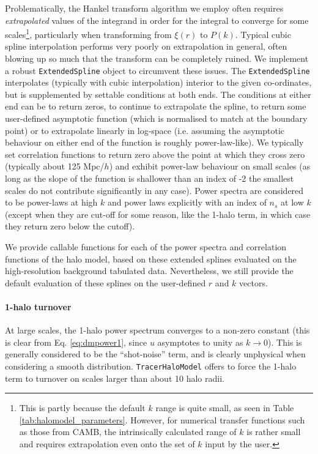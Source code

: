 \documentclass[5p,aas_macros]{elsarticle}
\begin{document}
Problematically, the Hankel transform algorithm we employ often requires \textit{extrapolated} values of the integrand in order for the integral to converge for some scales\footnote{This is partly because the default $k$ range is quite small, as seen in Table \ref{tab:halomodel_parameters}. However, for numerical transfer functions such as those from CAMB, the intrinsically calculated range of $k$ is rather small and requires extrapolation even onto the set of $k$ input by the user.}, particularly when transforming from $\xi(r)$ to $P(k)$.
Typical cubic spline interpolation performs very poorly on extrapolation in general, often blowing up so much that the transform can be completely ruined.
We implement a robust \verb|ExtendedSpline| object to circumvent these issues. 
The \verb|ExtendedSpline| interpolates (typically with cubic interpolation) interior to the given co-ordinates, but is supplemented by settable conditions at both ends. 
The conditions at either end can be to return zeros, to continue to extrapolate the spline, to return some user-defined asymptotic function (which is normalised to match at the boundary point) or to extrapolate linearly in log-space (i.e. assuming the asymptotic behaviour on either end of the function is roughly power-law-like). 
We typically set correlation functions to return zero above the point at which they cross zero (typically about 125 Mpc/$h$) and exhibit power-law behaviour on small scales (as long as the slope of the function is shallower than an index of -2 the smallest scales do not contribute significantly in any case). 
Power spectra are considered to be power-laws at high $k$ and power laws explicitly with an index of $n_s$ at low $k$ (except when they are cut-off for some reason, like the 1-halo term, in which case they return zero below the cutoff).

We provide callable functions for each of the power spectra and correlation functions of the halo model, based on these extended splines evaluated on the high-resolution background tabulated data. 
Nevertheless, we still provide the default evaluation of these splines on the user-defined $r$ and $k$ vectors. 


\paragraph*{1-halo turnover}
At large scales, the 1-halo power spectrum converges to a non-zero constant (this is clear from Eq. \ref{eq:dmpower1}, since $u$ asymptotes to unity as $k\rightarrow0$). This is generally considered to be the ``shot-noise'' term, and is clearly unphysical when considering a smooth distribution. 
\verb|TracerHaloModel| offers to force the 1-halo term to turnover on scales larger than about 10 halo radii. 
\end{document}
